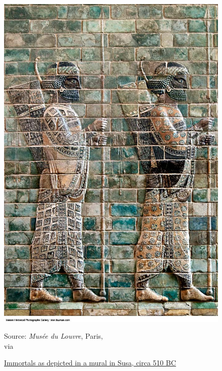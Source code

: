 \documentclass[twoside, a4paper, 12pt]{article}
\newcommand{\source}[1]{\caption*{Source: {#1}} }
\begin{document}
\par\vspace{1em}

\begin{figure}
  \centering
  \includegraphics[width=\linewidth]{ImmortalsSusa.jpg}
  \captionsetup{justification=raggedright}
  \caption{\ul{Immortals as depicted in a mural in Susa, circa 510 BC}}
  \source{\emph{Mus\'ee du Louvre}, Paris, \\ via \cite{iranian_historical_photography}}
  \label{img:ImmortalSusa}
\end{figure}
\end{document}
